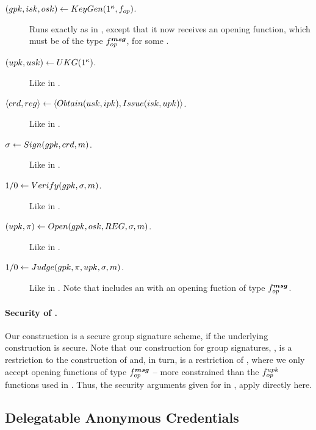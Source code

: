 \begin{description}
\item[$(gpk,isk,osk) \gets KeyGen(1^\kappa,f_{op})$.] Runs exactly as in
  \CUASGS, except that it now receives an opening function, which must be of
  the type $f_{op}^{\boldsymbol{msg}}$, for some \smsg.
\item[$(upk,usk) \gets UKG(1^\kappa)$.] Like in \CUASGS.  
\item[$\langle crd,reg \rangle \gets
  \langle Obtain(usk,ipk),Issue(isk,upk)\rangle$.] Like in \CUASGS.
\item[$\sigma \gets Sign(gpk,crd,m)$.] Like in \CUASGS.
\item[$1/0 \gets Verify(gpk,\sigma,m)$.] Like in \CUASGS.
\item[$(\upk,\pi) \gets \Open(\gpk,\osk,\trans,\sig,\msg)$.] Like in
  \CUASGS.
\item[$1/0 \gets Judge(gpk,\pi,upk,\sigma,m)$.] Like in \CUASGen. Note that
  \gpk includes an \opk with an opening fuction of type $f_{op}^{\boldsymbol{msg}}$.
\end{description}

\paragraph{Security of \CUASGSMDO.} %
Our \CUASGSMDO construction is a secure group signature scheme, if the
underlying \CUASGen construction is secure.
%
Note that our construction for group signatures, \CUASGS, is a restriction to
the construction of \CUASGen and, in turn, \CUASGSMDO is a restriction of
\CUASGS, where we only accept opening functions of type $f_{op}^{\boldsymbol{msg}}$ --
more constrained than the $f_{op}^{upk}$ functions used in \CUASGS. Thus, the
security arguments given for \CUASGS in , apply
directly here.

\subsection{Delegatable Anonymous Credentials}
\label{sapp:related-models-dac}

